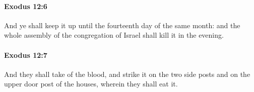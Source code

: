 		\paragraph{Exodus 12:6} %
			\label{EXODUS-12-6}

			And ye shall keep it up until the fourteenth day of the same month: and the whole assembly of the congregation of Israel shall kill it in the evening.


		\paragraph{Exodus 12:7} %
			\label{EXODUS-12-7}

			And they shall take of the blood, and strike it on the two side posts and on the upper door post of the houses, wherein they shall eat it.


